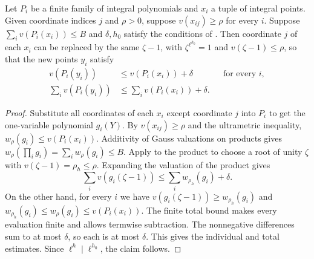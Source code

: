 \begin{lemma}
\label{lem:c-root-one-coordinate}
\emitthmsource
Let $P_i$ be a finite family of integral polynomials and $x_i$ a tuple of integral points.
Given coordinate indices $j$ and $\rho>0$, suppose $v(x_{ij})\ge\rho$ for every $i$.
Suppose $\sum_i v(P_i(x_i))\le B$ and $\delta,h_0$ satisfy the conditions of .
Then coordinate $j$ of each $x_i$ can be replaced by the same $\zeta-1$, with $\zeta^{\ell^{h_0}}=1$ and $v(\zeta-1)\le\rho$, so that the new points $y_i$ satisfy
\[
 \begin{aligned}
 v(P_i(y_i))&\le v(P_i(x_i))+\delta &&\text{for every }i,\\
 \sum_i v(P_i(y_i))&\le\sum_i v(P_i(x_i))+\delta.
 \end{aligned}
\]
\end{lemma}
\begin{proof}
Substitute all coordinates of each $x_i$ except coordinate $j$ into $P_i$ to get the one-variable polynomial $g_i(Y)$.
By $v(x_{ij})\ge\rho$ and the ultrametric inequality, $w_\rho(g_i)\le v(P_i(x_i))$.
Additivity of Gauss valuations on products gives $w_\rho(\prod_i g_i)=\sum_i w_\rho(g_i)\le B$. Apply  to the product to choose a root of unity $\zeta$ with $v(\zeta-1)=\rho_h\le\rho$. Expanding the valuation of the product gives
\[
 \sum_i v(g_i(\zeta-1))\le\sum_i w_{\rho_h}(g_i)+\delta.
\]
On the other hand, for every $i$ we have $v(g_i(\zeta-1))\ge w_{\rho_h}(g_i)$ and $w_{\rho_h}(g_i)\le w_\rho(g_i)\le v(P_i(x_i))$.
The finite total bound makes every evaluation finite and allows termwise subtraction. The nonnegative differences sum to at most $\delta$, so each is at most $\delta$.
This gives the individual and total estimates. Since $\ell^h\mid\ell^{h_0}$, the claim follows.
\end{proof}

